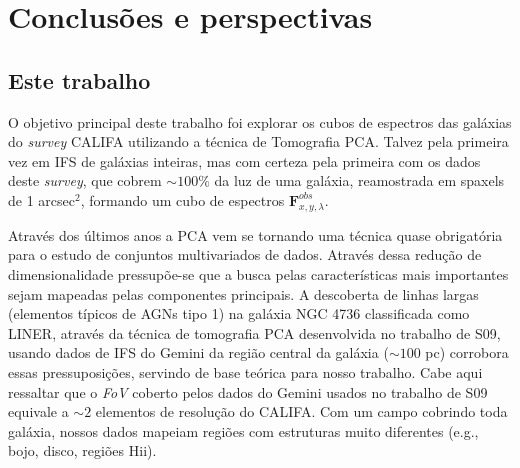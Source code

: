 


\chapter{Conclusões e perspectivas}
\label{sec:conclusao}


\section{Este trabalho}
\label{sec:conclusao:thisWork}

O objetivo principal deste trabalho foi explorar os cubos de espectros das galáxias do {\em survey} CALIFA utilizando a
técnica de Tomografia PCA. Talvez pela primeira vez em IFS de galáxias inteiras, mas com certeza pela primeira com os
dados deste {\em survey}, que cobrem $\sim100\%$ da luz de uma galáxia, reamostrada em spaxels de 1 arcsec$^2$, formando
um cubo de espectros $\mathbf{F}_{x,y,\lambda}^{obs}$. 

Através dos últimos anos a PCA vem se tornando uma técnica quase obrigatória para o estudo de conjuntos multivariados de
dados. Através dessa redução de dimensionalidade pressupõe-se que a busca pelas características mais importantes sejam
mapeadas pelas componentes principais. A descoberta de linhas largas (elementos típicos de AGNs tipo 1) na galáxia NGC
4736 classificada como LINER, através da técnica de tomografia PCA desenvolvida no trabalho de S09, usando dados de IFS
do Gemini da região central da galáxia ($\sim100$ pc) corrobora essas pressuposições, servindo de base teórica para
nosso trabalho. Cabe aqui ressaltar que o {\em FoV} coberto pelos dados do Gemini usados no trabalho de S09 equivale a
$\sim2$ elementos de resolução do CALIFA. Com um campo cobrindo toda galáxia, nossos dados mapeiam regiões com
estruturas muito diferentes (e.g., bojo, disco, regiões H{\sc ii}).

